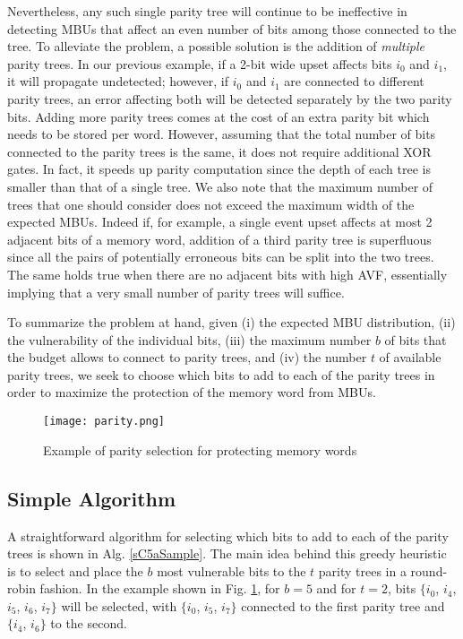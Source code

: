 \documentclass[12pt]{yalephd}
\begin{document}
Nevertheless, any such single parity tree will continue to be ineffective in detecting MBUs that affect an even number of bits among those connected to the tree. To alleviate the problem, a possible solution is the addition of {\it multiple} parity trees. In our previous example, if a 2-bit wide upset affects bits $i_0$ and $i_1$, it will propagate undetected; however, if $i_0$ and $i_1$ are connected to different parity trees, an error affecting both will be detected separately by the two parity bits. Adding more parity trees comes at the cost of an extra parity bit which needs to be stored per word. However, assuming that the total number of bits connected to the parity trees is the same, it does not require additional XOR gates. In fact, it speeds up parity computation since the depth of each tree is smaller than that of a single tree. We also note that the maximum number of trees that one should consider does not exceed the maximum width of the expected MBUs. Indeed if, for example, a single event upset affects at most 2 adjacent bits of a memory word, addition of a third parity tree is superfluous since all the pairs of potentially erroneous bits can be split into the two trees. The same holds true when there are no adjacent bits with high AVF, essentially implying that a very small number of parity trees will suffice.

To summarize the problem at hand, given (i) the expected MBU distribution, (ii) the vulnerability of the individual bits, (iii) the maximum number $b$ of bits that the budget allows to connect to parity trees, and (iv) the number $t$ of available parity trees, we seek to choose which bits to add to each of the parity trees in order to maximize the protection of the memory word from MBUs.

\begin{figure}[!ht]%
\texttt{[image: parity.png]}%
\caption{Example of parity selection for protecting memory words}%
\label{sC5fParity}%
\end{figure}

\subsection{Simple Algorithm}
A straightforward algorithm for selecting which bits to add to each of the parity trees is shown in Alg. \ref{sC5aSample}. The main idea behind this greedy heuristic is to select and place the $b$ most vulnerable bits to the $t$ parity trees in a round-robin fashion. In the example shown in Fig. \ref{sC5fParity}, for $b = 5$ and for $t = 2$, bits $\{i_0$, $i_4$, $i_5$, $i_6$, $i_7\}$ will be selected, with $\{i_0$, $i_5$, $i_7\}$ connected to the first parity tree and $\{i_4$, $i_6\}$ to the second.
\end{document}
